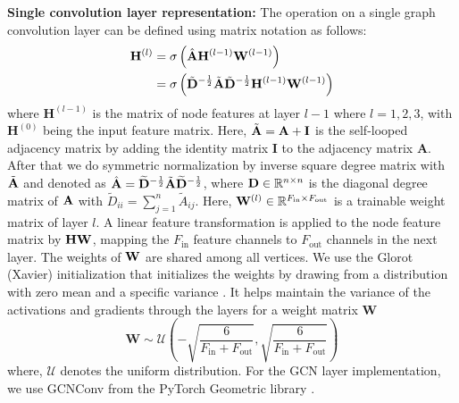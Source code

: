 \documentclass[aps, prd, showpacs, floatfix, superscriptaddress, twocolumn, nofootinbib, preprintnumbers, longbibliography]{revtex4-2}
\begin{document}
\textbf{Single convolution layer representation:}
The operation on a single graph convolution layer can be defined using matrix notation as follows:
\begin{equation}\nonumber %
\begin{split}
{\bf H}^{(l)} &= \sigma \left( \hat{{\bf A}} {\bf H}^{(l-1)} {\bf W}^{(l-1)} \right)\\
&=\sigma \left(\tilde{\bf D}^{-\frac{1}{2}}\tilde{{\bf A}} \tilde{\bf D}^{-\frac{1}{2}} {\bf H}^{(l-1)} {\bf W}^{(l-1)}\right) 
\end{split}
\end{equation}
where $\mathbf{H}^{(l-1)}$ is the matrix of node features at layer $l-1$ where $l=1, 2, 3$, with \(\mathbf{H}^{(0)}\) being the input feature matrix. Here, $\tilde{{\bf A}} = {\bf A} + {\bf I}$ is the self-looped adjacency matrix by adding the identity matrix {\bf I} to the adjacency matrix {\bf A}. After that we do symmetric normalization by inverse square degree matrix with $\tilde{{\bf A}}$ and denoted as $\hat{{\bf A}} = \widetilde{\bf D}^{-\frac{1}{2}}\tilde{{\bf A}} \widetilde{\bf D}^{-\frac{1}{2}}$, where ${\bf D} \in \mathbb{R}^{n\times n}$ is the diagonal degree matrix of ${\bf A}$ with $\tilde{D}_{ii} = \sum_{j = 1}^{n} \tilde{A}_{ij}$. Here, ${\bf W}^{(l)} \in \mathbb{R}^{F_{\text{in}} \times F_{\text{out}}}$ is a trainable weight matrix of layer $l$. A linear feature transformation is applied to the node feature matrix by ${\bf HW}$, mapping the $F_{\text{in}}$ feature channels to $F_{\text{out}}$ channels in the next layer. The weights of ${\bf W}$ are shared among all vertices. We use the Glorot (Xavier) initialization that initializes the weights by drawing from a distribution with zero mean and a specific variance \cite{glorot2010understanding}. It helps maintain the variance of the activations and gradients through the layers for a weight matrix \(\mathbf{W}\) 
\begin{equation}
\mathbf{W} \sim \mathcal{U} \left( -\sqrt{\frac{6}{F_{\text{in}} + F_{\text{out}}}}, \sqrt{\frac{6}{F_{\text{in}} + F_{\text{out}}}} \right)    
\end{equation}
where, $\mathcal{U}$ denotes the uniform distribution. For the GCN layer implementation, we use GCNConv from the PyTorch Geometric library \cite{FeyLenssen2019}.

\end{document}
